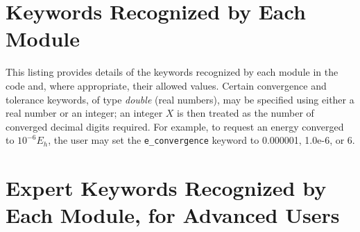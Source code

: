 \section{Keywords Recognized by Each Module}\label{keywords}
This listing provides details of the keywords recognized by each module in the
code and, where appropriate, their allowed values.  Certain convergence and tolerance
keywords, of type {\it double} (real numbers), may be specified using
either a real number or an integer; an integer $X$ is then treated as the
number of converged decimal digits required.  For example, to request an energy
converged to $10^{-6} E_h$, the user may set the {\tt e\_convergence} keyword
to 0.000001, 1.0e-6, or 6.

\section{Expert Keywords Recognized by Each Module, for Advanced
Users}\label{expertkeywords}

